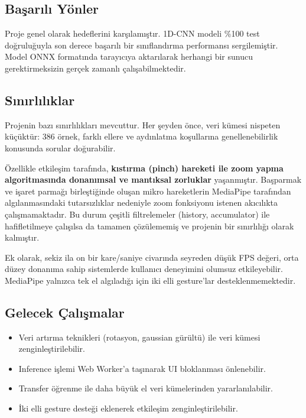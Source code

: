 \documentclass[12pt,a4paper]{article}
\begin{document}
\subsection{Başarılı Yönler}

Proje genel olarak hedeflerini karşılamıştır. 1D-CNN modeli \%100 test doğruluğuyla son derece başarılı bir sınıflandırma performansı sergilemiştir. Model ONNX formatında tarayıcıya aktarılarak herhangi bir sunucu gerektirmeksizin gerçek zamanlı çalışabilmektedir.

\subsection{Sınırlılıklar}

Projenin bazı sınırlılıkları mevcuttur. Her şeyden önce, veri kümesi nispeten küçüktür: 386 örnek, farklı ellere ve aydınlatma koşullarına genellenebilirlik konusunda sorular doğurabilir.

Özellikle etkileşim tarafında, \textbf{kıstırma (pinch) hareketi ile zoom yapma algoritmasında donanımsal ve mantıksal zorluklar} yaşanmıştır. Başparmak ve işaret parmağı birleştiğinde oluşan mikro hareketlerin MediaPipe tarafından algılanmasındaki tutarsızlıklar nedeniyle zoom fonksiyonu istenen akıcılıkta çalışmamaktadır. Bu durum çeşitli filtrelemeler (history, accumulator) ile hafifletilmeye çalışılsa da tamamen çözülememiş ve projenin bir sınırlılığı olarak kalmıştır.

Ek olarak, sekiz ila on bir kare/saniye civarında seyreden düşük FPS değeri, orta düzey donanıma sahip sistemlerde kullanıcı deneyimini olumsuz etkileyebilir. MediaPipe yalnızca tek el algıladığı için iki elli gesture'lar desteklenmemektedir.

\subsection{Gelecek Çalışmalar}

\begin{itemize}
    \item Veri artırma teknikleri (rotasyon, gaussian gürültü) ile veri kümesi zenginleştirilebilir.
    \item Inference işlemi Web Worker'a taşınarak UI bloklanması önlenebilir.
    \item Transfer öğrenme ile daha büyük el veri kümelerinden yararlanılabilir.
    \item İki elli gesture desteği eklenerek etkileşim zenginleştirilebilir.
\end{itemize}
\end{document}
